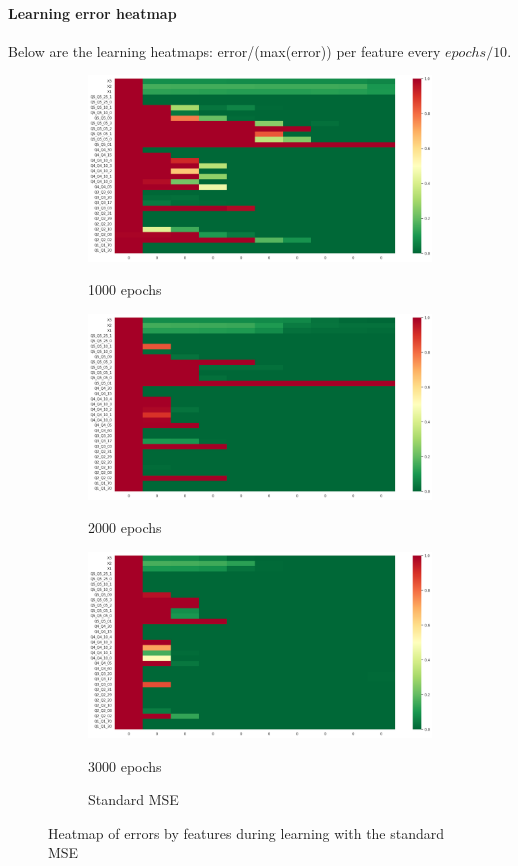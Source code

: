 \documentclass{article}
\theoremstyle{definition}
\begin{document}
\paragraph{Learning error heatmap}
     \label{learningHeatmap}
Below are the learning heatmaps: error/(max(error)) per feature every $epochs/10$.
\begin{figure}[H]
     \centering
     \begin{subfigure}[b]{0.49\textwidth}
         \centering
         \includegraphics[width=\textwidth]{imgs/Illu/1000Epochs/Imb/MSE_covariates_heatmap.png}
         \caption{1000 epochs}
         \quad
         \includegraphics[width=\textwidth]{imgs/Illu/2000Epochs/Imb/MSE_covariates_heatmap.png}
         \caption{2000 epochs}
         \quad
         \includegraphics[width=\textwidth]{imgs/Illu/3000Epochs/Imb/MSE_covariates_heatmap.png}
         \caption{3000 epochs}
         \caption{Standard MSE}
     \end{subfigure}
     \caption{Heatmap of errors by features during learning with the standard MSE}
\end{figure}
\end{document}

